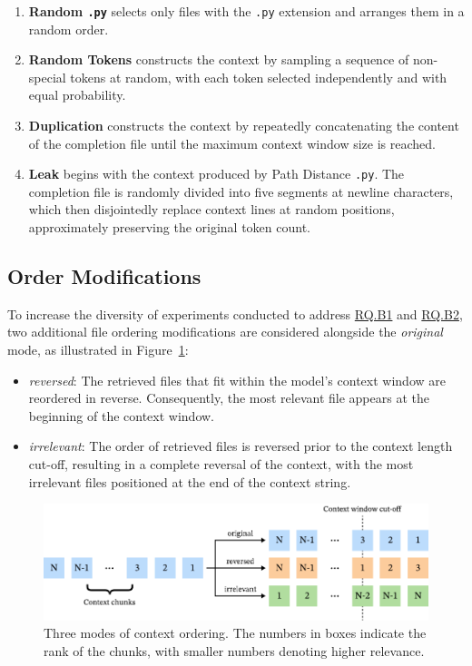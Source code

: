 \begin{enumerate}
    \item \textbf{Random \texttt{.py}} selects only files with the \texttt{.py} extension and arranges them in a random order.
    \item \textbf{Random Tokens} constructs the context by sampling a sequence of non-special tokens at random, with each token selected independently and with equal probability.
    \item \textbf{Duplication} constructs the context by repeatedly concatenating the content of the completion file until the maximum context window size is reached.
    \item \textbf{Leak} begins with the context produced by Path Distance \texttt{.py}. The completion file is randomly divided into five segments at newline characters, which then disjointedly replace context lines at random positions, approximately preserving the original token count.
\end{enumerate}

\subsection{Order Modifications}

To increase the diversity of experiments conducted to address \hyperref[rq:rq-b1]{RQ.B1} and \hyperref[rq:rq-b2]{RQ.B2}, two additional file ordering modifications are considered alongside the \textit{original} mode, as illustrated in Figure~\ref{fig:order-modes}:

\begin{itemize}
    \item \textit{reversed}: The retrieved files that fit within the model's context window are reordered in reverse. Consequently, the most relevant file appears at the beginning of the context window.
    \item \textit{irrelevant}: The order of retrieved files is reversed prior to the context length cut-off, resulting in a complete reversal of the context, with the most irrelevant files positioned at the end of the context string.
\end{itemize}

\begin{figure}[ht]
    \centering
    \includegraphics[width=\textwidth]{figures/order-modes.pdf}
    \caption{Three modes of context ordering. The numbers in boxes indicate the rank of the chunks, with smaller numbers denoting higher relevance.}\label{fig:order-modes}
\end{figure}

